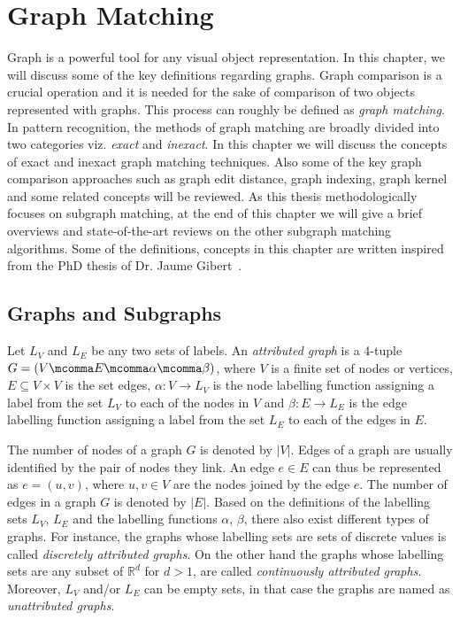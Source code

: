 \chapter{Graph Matching}
\label{chap:gm}
\graphicspath{{./chapters/2-gm/figs/}}
Graph is a powerful tool for any visual object representation. In this chapter, we will discuss some of the key definitions regarding graphs. Graph comparison is a crucial operation and it is needed for the sake of comparison of two objects represented with graphs. This process can roughly be defined as \emph{graph matching}. In pattern recognition, the methods of graph matching are broadly divided into two categories viz. \emph{exact} and \emph{inexact}. In this chapter we will discuss the concepts of exact and inexact graph matching techniques. Also some of the key graph comparison approaches such as graph edit distance, graph indexing, graph kernel and some related concepts will be reviewed. As this thesis methodologically focuses on subgraph matching, at the end of this chapter we will give a brief overviews and state-of-the-art reviews on the other subgraph matching algorithms. Some of the definitions, concepts in this chapter are written inspired from the PhD thesis of Dr. Jaume Gibert~\cite{GibertThesis2012}.

\section{Graphs and Subgraphs}
\begin{definition}[Graph]
Let $L_V$ and $L_E$ be any two sets of labels. An \emph{attributed graph} is a 4-tuple $G=(V\mcomma E\mcomma\alpha\mcomma\beta)$, where $V$ is a finite set of nodes or vertices, $E\subseteq V\times V$ is the set edges, $\alpha:V\rightarrow L_V$ is the node labelling function assigning a label from the set $L_V$ to each of the nodes in $V$ and $\beta:E\rightarrow L_E$ is the edge labelling function assigning a label from the set $L_E$ to each of the edges in $E$.
\end{definition}

The number of nodes of a graph $G$ is denoted by $|V|$. Edges of a graph are usually identified by the pair of nodes they link. An edge $e\in E$ can thus be represented as $e=(u,v)$, where $u,v\in V$ are the nodes joined by the edge $e$. The number of edges in a graph $G$ is denoted by $|E|$. Based on the definitions of the labelling sets $L_V$, $L_E$ and the labelling functions $\alpha$, $\beta$, there also exist different types of graphs. For instance, the graphs whose labelling sets are sets of discrete values is called \emph{discretely attributed graphs}. On the other hand the graphs whose labelling sets are any subset of $\mathbb{R}^{d}$ for $d>1$, are called \emph{continuously attributed graphs}. Moreover, $L_V$ and/or $L_E$ can be empty sets, in that case the graphs are named as \emph{unattributed graphs}.

